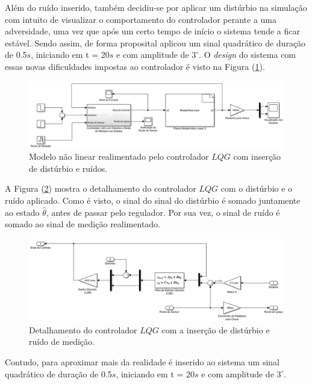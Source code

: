 Além do ruído inserido, também decidiu-se por aplicar um distúrbio na simulação com intuito de visualizar o comportamento do controlador perante a uma adversidade, uma vez que após um certo tempo de início o sistema tende a ficar estável. Sendo assim, de forma proposital aplicou um sinal quadrático de duração de 0.5$s$, iniciando em t = 20$s$ e com amplitude de $3^\circ$. O \textit{design} do sistema com essas novas dificuldades impostas ao controlador é visto na Figura (\ref{fig:Implementacao-LQG-real}).
\begin{figure}[H]
    \centering
    \includegraphics[scale=0.5]{ProjControladores/lqg_control_real.png}
    \caption{Modelo não linear realimentado pelo controlador $LQG$ com inserção de distúrbio e ruídos.}
    \label{fig:Implementacao-LQG-real}
\end{figure}{}

A Figura (\ref{fig:Topografia-controladorLQG-real}) mostra o detalhamento do controlador $LQG$ com o distúrbio e o ruído aplicado. Como é visto, o sinal do sinal do distúrbio é somado juntamente ao estado $\hat{\theta}$, antes de passar pelo regulador. Por sua vez, o sinal de ruído é somado ao sinal de medição realimentado.
\begin{figure}[H]
    \centering
    \includegraphics[scale=0.5]{ProjControladores/topografia_lqg_real.png}
    \caption{Detalhamento do controlador $LQG$ com a inserção de distúrbio e ruído de medição.}
    \label{fig:Topografia-controladorLQG-real}
\end{figure}{}

Contudo, para aproximar mais da realidade é inserido ao sistema um sinal quadrático de duração de 0.5$s$, iniciando em t = 20$s$ e com amplitude de $3^\circ$.

